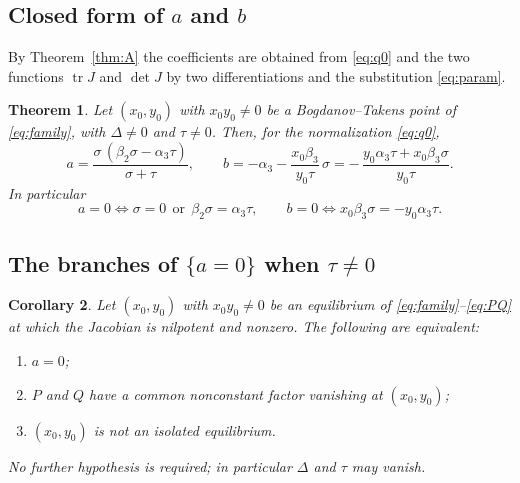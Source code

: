\documentclass[12pt]{article}
\theoremstyle{plain}
\newtheorem{theorem}{Theorem}[section]
\newtheorem{corollary}[theorem]{Corollary}
\theoremstyle{definition}
\theoremstyle{remark}
\newcommand{\tr}{\operatorname{tr}}
\DeclareMathOperator{\dt}{det}
\begin{document}
	\subsection{Closed form of \texorpdfstring{$a$}{a} and
		\texorpdfstring{$b$}{b}}\label{ss:closed}
	
	By Theorem~\ref{thm:A} the coefficients are obtained from
	\eqref{eq:q0} and the two functions $\tr J$ and $\dt J$ by two
	differentiations and the substitution \eqref{eq:param}.
	
	\begin{theorem}\label{thm:ab}
		Let $(x_{0},y_{0})$ with $x_{0}y_{0}\neq0$ be a Bogdanov--Takens point
		of \eqref{eq:family}, with $\Delta\neq0$ and $\tau\neq0$.  Then, for
		the normalization \eqref{eq:q0},
		\begin{equation}\label{eq:abclosed}
			a=\frac{\sigma\,(\beta_{2}\sigma-\alpha_{3}\tau)}{\sigma+\tau},
			\qquad
			b=-\alpha_{3}-\frac{x_{0}\beta_{3}}{y_{0}\tau}\,\sigma
			=-\,\frac{y_{0}\alpha_{3}\tau+x_{0}\beta_{3}\sigma}{y_{0}\tau} .
		\end{equation}
		In particular
		\begin{equation}\label{eq:zeros}
			a=0\iff
			\sigma=0\ \ \text{or}\ \ \beta_{2}\sigma=\alpha_{3}\tau ,
			\qquad
			b=0\iff x_{0}\beta_{3}\sigma=-y_{0}\alpha_{3}\tau .
		\end{equation}
	\end{theorem}
	
	\subsection{The branches of \texorpdfstring{$\{a=0\}$}{a=0} when
		\texorpdfstring{$\tau\neq0$}{tau nonzero}}
	
	\begin{corollary}\label{cor:equiv}
		Let $(x_{0},y_{0})$ with $x_{0}y_{0}\neq0$ be an equilibrium of
		\eqref{eq:family}--\eqref{eq:PQ} at which the Jacobian is nilpotent and
		nonzero.  The following are equivalent:
		\begin{enumerate}[label=\rm(\roman*)]
			\item $a=0$;
			\item $P$ and $Q$ have a common nonconstant factor vanishing at
			$(x_{0},y_{0})$;
			\item $(x_{0},y_{0})$ is not an isolated equilibrium.
		\end{enumerate}
		No further hypothesis is required; in particular $\Delta$ and $\tau$ may
		vanish.
	\end{corollary}
	
\end{document}
